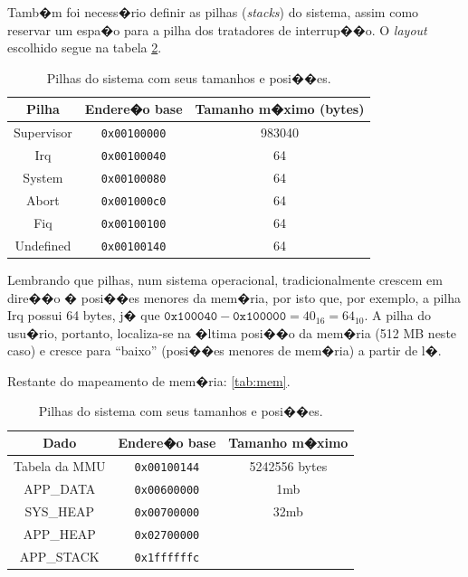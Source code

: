 \documentclass{ufscThesis/ufscThesis} %
\begin{document}
Tamb�m foi necess�rio definir as pilhas (\emph{stacks}) do sistema, assim como reservar um espa�o para a pilha dos tratadores de interrup��o. O \emph{layout} escolhido segue na tabela \ref{tab:stacks}.
\begin{table}[hb]
	\centering
	\begin{tabular}{ccc}
		\hline \hline
		Pilha & Endere�o base & Tamanho m�ximo (bytes)\\[0.5ex]
		\hline
		Supervisor		& \verb+0x00100000+ & 983040\\
		Irq			& \verb+0x00100040+ & 64\\
		System			& \verb+0x00100080+ & 64\\
		Abort			& \verb+0x001000c0+ & 64\\
		Fiq			& \verb+0x00100100+ & 64\\
		Undefined		& \verb+0x00100140+ & 64\\[1ex]
		\hline
	\end{tabular}
	\caption{Pilhas do sistema com seus tamanhos e posi��es.}
	\label{tab:stacks}
\end{table}

Lembrando que pilhas, num sistema operacional, tradicionalmente crescem em dire��o � posi��es menores da mem�ria, por isto que, por exemplo, a pilha Irq possui 64 bytes, j� que $\texttt{0x100040}-\texttt{0x100000} = 40_{16} = 64_{10}$. A pilha do usu�rio, portanto, localiza-se na �ltima posi��o da mem�ria (512 MB neste caso) e cresce para ``baixo'' (posi��es menores de mem�ria) a partir de l�.



Restante do mapeamento de mem�ria:
\ref{tab:mem}.
\begin{table}[hb]
	\centering
	\begin{tabular}{ccc}
		\hline \hline
		Dado & Endere�o base & Tamanho m�ximo\\[0.5ex]
		\hline
		Tabela da MMU		& \verb+0x00100144+ & 5242556 bytes\\
		APP\_DATA		& \verb+0x00600000+ & 1mb\\
		SYS\_HEAP		& \verb+0x00700000+ & 32mb\\
		APP\_HEAP		& \verb+0x02700000+ & \\
		APP\_STACK		& \verb+0x1ffffffc+ & \\[1ex]
		\hline
	\end{tabular}
	\caption{Pilhas do sistema com seus tamanhos e posi��es.}
	\label{tab:stacks}
\end{table}
\end{document}
